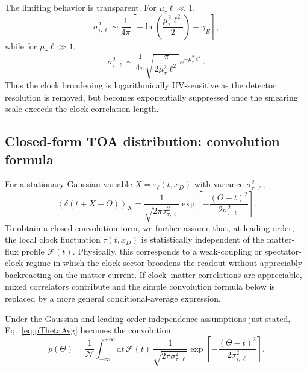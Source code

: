 \documentclass[11pt, a4paper]{article}
\theoremstyle{definition}
\theoremstyle{plain}
\theoremstyle{remark}
\numberwithin{equation}{section}
\newcommand{\dd}{\mathrm{d}}
\newcommand{\F}{\mathcal{F}}
\begin{document}
        The limiting behavior is transparent. For $\mu_\tau\ell\ll1$,
        \begin{equation}
            \sigma_{\tau,\ell}^{2}
            \sim
            \frac{1}{4\pi}
            \left[
            -\ln\left(\frac{\mu_\tau^2\ell^2}{2}\right)-\gamma_E
            \right],
            \label{eq:smallSmearingLimit}
        \end{equation}
        while for $\mu_\tau\ell\gg1$,
        \begin{equation}
            \sigma_{\tau,\ell}^{2}
            \sim
            \frac{1}{4\pi}
            \sqrt{\frac{\pi}{2\mu_\tau^2\ell^2}}
            e^{-\mu_\tau^2\ell^2}.
            \label{eq:largeSmearingLimit}
        \end{equation}
        Thus the clock broadening is logarithmically UV-sensitive as the detector resolution is removed, but becomes exponentially suppressed once the smearing scale exceeds the clock correlation length.
    
    \subsection{Closed-form TOA distribution: convolution formula}
        
        For a stationary Gaussian variable $X=\tau_\ell(t,x_D)$ with variance $\sigma_{\tau,\ell}^2$,
        \begin{equation}
            \left\langle \delta(t+X-\Theta)\right\rangle_X
            =\frac{1}{\sqrt{2\pi\sigma_{\tau,\ell}^2}}
            \exp\!\left[-\frac{(\Theta-t)^2}{2\sigma_{\tau,\ell}^2}\right].
        \end{equation}
        To obtain a closed convolution form, we further assume that, at leading order, the local clock fluctuation $\tau(t,x_D)$ is statistically independent of the matter-flux profile $\mathcal{F}(t)$. Physically, this corresponds to a weak-coupling or spectator-clock regime in which the clock sector broadens the readout without appreciably backreacting on the matter current. If clock--matter correlations are appreciable, mixed correlators contribute and the simple convolution formula below is replaced by a more general conditional-average expression.
        
        Under the Gaussian and leading-order independence assumptions just stated, Eq.~\eqref{eq:pThetaAvg} becomes the convolution
        \begin{equation}
            p(\Theta)=\frac{1}{\mathcal{N}}
            \int_{-\infty}^{+\infty}\dd t\,
            \F(t)\,
            \frac{1}{\sqrt{2\pi\sigma_{\tau,\ell}^2}}
            \exp\!\left[-\frac{(\Theta-t)^2}{2\sigma_{\tau,\ell}^2}\right].
            \label{eq:convolution}
        \end{equation}
        
\end{document}
